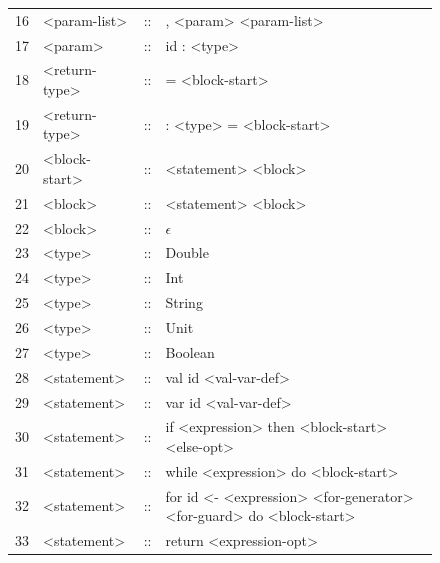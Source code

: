 \documentclass[11pt]{article}
\begin{document}
{{{\begin{figure}[H]
\begin{tabularx}{\textwidth}{r l c >{\raggedright\arraybackslash}X}
				  16 & <param-list>      & :: & , <param> <param-list>                                              \\
				  17 & <param>           & :: & id : <type>                                                         \\
				  18 & <return-type>     & :: & = <block-start>                                                     \\
				  19 & <return-type>     & :: & : <type> = <block-start>                                            \\
				  20 & <block-start>     & :: & <statement> <block>                                                 \\
				  21 & <block>           & :: & <statement> <block>                                                 \\
				  22 & <block>           & :: & \(\epsilon\)                                                        \\
				  23 & <type>            & :: & Double                                                              \\
				  24 & <type>            & :: & Int                                                                 \\
				  25 & <type>            & :: & String                                                              \\
				  26 & <type>            & :: & Unit                                                                \\
				  27 & <type>            & :: & Boolean                                                             \\
				  28 & <statement>       & :: & val id <val-var-def>                                                \\
				  29 & <statement>       & :: & var id <val-var-def>                                                \\
				  30 & <statement>       & :: & if <expression> then <block-start> <else-opt>                       \\
				  31 & <statement>       & :: & while <expression> do <block-start>                                 \\
				  32 & <statement>       & :: & for id <- <expression> <for-generator> <for-guard> do <block-start> \\
				  33 & <statement>       & :: & return <expression-opt>                                             \\

\end{tabularx}
\end{figure}}}}
\end{document}
